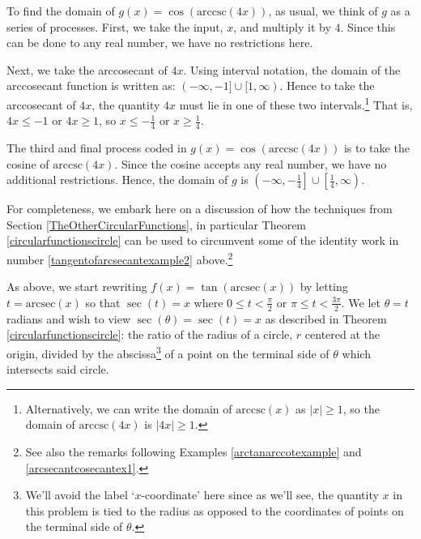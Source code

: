 \documentclass{ximera}
\begin{document}
\begin{example}
\begin{explanation}
\begin{enumerate}
\begin{enumerate}
To find the domain of $g(x) = \cos(\text{arccsc}(4x))$, as usual, we think of $g$ as a series of processes. First, we take the input, $x$, and multiply it by $4$.  Since this can be done to any real number, we have no restrictions here.

 

Next, we take the arccosecant of $4x$.  Using interval notation, the domain of the arccosecant function is written as: $(-\infty, -1] \cup [1, \infty)$.  Hence to take the arccosecant of $4x$, the quantity $4x$ must lie in one of these two intervals.\footnote{Alternatively, we can write the domain of $\text{arccsc}(x)$ as $|x| \geq 1$, so the domain of  $\text{arccsc}(4x)$ is $|4x| \geq 1$.}  That is, $4x \leq -1$ or $4x \geq 1$, so $x \leq -\frac{1}{4}$ or $x \geq \frac{1}{4}$.

 

The third and final process coded in $g(x) = \cos(\text{arccsc}(4x))$ is to take the cosine of $\text{arccsc}(4x)$. Since the cosine accepts any real number, we have no additional restrictions.  Hence, the domain of $g$ is $\left( -\infty, -\frac{1}{4} \right] \cup \left[ \frac{1}{4}, \infty \right)$.  


\end{enumerate}

\end{enumerate}
\end{explanation}
\end{example}

 

For completeness, we embark here on a discussion of how the techniques from Section \ref{TheOtherCircularFunctions}, in particular Theorem \ref{circularfunctionscircle} can be used to circumvent some of the identity work in number \ref{tangentofarcsecantexample2} above.\footnote{See also the remarks following Examples \ref{arctanarccotexample} and  \ref{arcsecantcosecantex1}.}

 

As above, we start rewriting $f(x)  = \tan(\text{arcsec}(x))$ by letting $t = \text{arcsec}(x)$ so that $\sec(t) = x$ where  $0 \leq t < \frac{\pi}{2}$ or  $\pi \leq t < \frac{3\pi}{2}$.  We let $\theta = t$ radians and wish to view $\sec(\theta) = \sec(t) = x$ as described in Theorem \ref{circularfunctionscircle}: the ratio of the radius of a circle, $r$ centered at the origin,   divided by the abscissa\footnote{We'll avoid the label `$x$-coordinate' here since as we'll see, the quantity $x$ in this problem is tied to the radius as opposed to the coordinates of points on the terminal side of $\theta$.} of a point on the terminal side of $\theta$  which intersects said circle.
\end{document}
